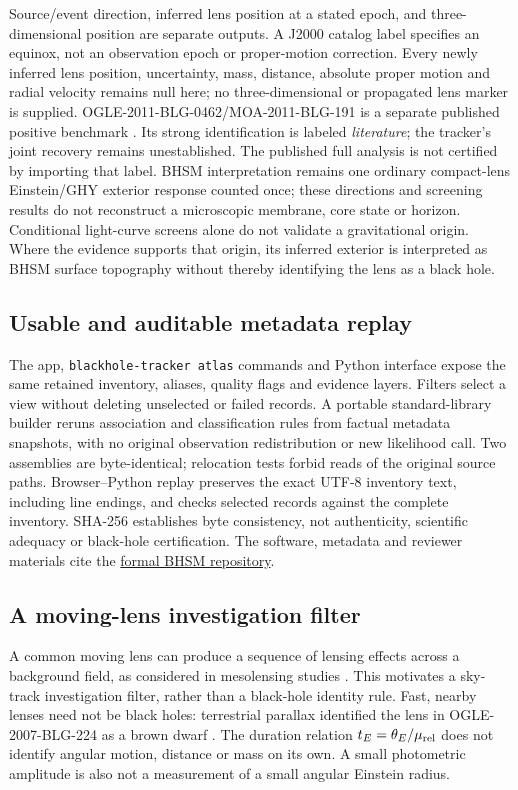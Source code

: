 Source/event direction, inferred lens position at a stated epoch, and
three-dimensional position are separate outputs. A J2000 catalog label
specifies an equinox, not an observation epoch or proper-motion
correction. Every newly inferred lens position, uncertainty, mass,
distance, absolute proper motion and radial velocity remains null here;
no three-dimensional or propagated lens marker is supplied.
OGLE-2011-BLG-0462/MOA-2011-BLG-191 is a separate published positive
benchmark \cite{Sahu2025}. Its strong identification is labeled
\emph{literature}; the tracker's joint recovery remains unestablished.
The published full analysis is not certified by importing that label.
BHSM interpretation remains one ordinary compact-lens Einstein/GHY
exterior response counted once; these directions and screening results
do not reconstruct a microscopic membrane, core state or horizon.
Conditional light-curve screens alone do not validate a gravitational
origin. Where the evidence supports that origin, its inferred exterior
is interpreted as BHSM surface topography without thereby identifying
the lens as a black hole.

\subsection{Usable and auditable metadata replay}

The app, \texttt{blackhole-tracker atlas} commands and Python interface
expose the same retained inventory, aliases, quality flags and evidence
layers. Filters select a view without deleting unselected or failed
records. A portable standard-library builder reruns association and
classification rules from factual metadata snapshots, with no original
observation redistribution or new likelihood call. Two assemblies are
byte-identical; relocation tests forbid reads of the original source
paths. Browser--Python replay preserves the exact UTF-8 inventory text,
including line endings, and checks selected records against the complete
inventory. SHA-256 establishes byte consistency, not authenticity,
scientific adequacy or black-hole certification. The software,
metadata and reviewer materials cite the
\href{https://github.com/ncarberry64/Berger-Hopf-Standard-Model}{formal BHSM repository}.

\subsection{A moving-lens investigation filter}

A common moving lens can produce a sequence of lensing effects across a
background field, as considered in mesolensing studies
\cite{DiStefano2005Mesolensing}. This motivates a sky-track investigation
filter, rather than a black-hole identity rule. Fast, nearby lenses need
not be black holes: terrestrial parallax identified the lens in
OGLE-2007-BLG-224 as a brown dwarf \cite{Gould2009BrownDwarf}.
The duration relation $t_E=\theta_E/\mu_{\rm rel}$ does not identify
angular motion, distance or mass on its own. A small photometric
amplitude is also not a measurement of a small angular Einstein radius.


